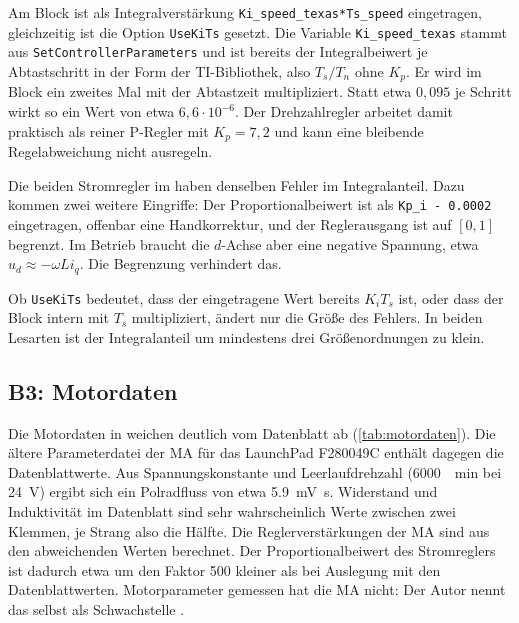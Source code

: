 Am Block  ist als Integralverstärkung
\texttt{Ki\_speed\_texas*Ts\_speed} eingetragen, gleichzeitig ist die Option
\texttt{UseKiTs} gesetzt. Die Variable \texttt{Ki\_speed\_texas} stammt aus
\texttt{SetControllerParameters} und ist bereits der Integralbeiwert je Abtastschritt in der
Form der TI-Bibliothek, also $T_s/T_n$ ohne $K_p$. Er wird im Block ein zweites Mal mit der
Abtastzeit multipliziert. Statt etwa $0{,}095$ je Schritt wirkt so ein Wert von etwa
$6{,}6 \cdot 10^{-6}$. Der Drehzahlregler arbeitet damit praktisch als reiner P-Regler mit
$K_p = 7{,}2$ und kann eine bleibende Regelabweichung nicht ausregeln.

Die beiden Stromregler im  haben denselben Fehler im
Integralanteil. Dazu kommen zwei weitere Eingriffe: Der Proportionalbeiwert ist als
\texttt{Kp\_i - 0.0002} eingetragen, offenbar eine Handkorrektur, und der Reglerausgang ist
auf $[0, 1]$ begrenzt. Im Betrieb braucht die $d$-Achse aber eine negative Spannung, etwa
$u_d \approx -\omega L i_q$. Die Begrenzung verhindert das.

Ob \texttt{UseKiTs} bedeutet, dass der eingetragene Wert bereits $K_i T_s$ ist, oder dass der
Block intern mit $T_s$ multipliziert, ändert nur die Größe des Fehlers. In beiden Lesarten
ist der Integralanteil um mindestens drei Größenordnungen zu klein.

\subsection*{B3: Motordaten}

Die Motordaten in  weichen deutlich vom Datenblatt ab
(\cref{tab:motordaten}). Die ältere Parameterdatei der \ac{MA} für das LaunchPad F280049C
enthält dagegen die Datenblattwerte. Aus Spannungskonstante und Leerlaufdrehzahl
(\SI{6000}{\per\minute} bei \SI{24}{\volt}) ergibt sich ein Polradfluss von etwa
\SI{5,9}{\milli\volt\second}. Widerstand und Induktivität im Datenblatt sind sehr
wahrscheinlich Werte zwischen zwei Klemmen, je Strang also die Hälfte. Die
Reglerverstärkungen der \ac{MA} sind aus den abweichenden Werten berechnet. Der
Proportionalbeiwert des Stromreglers ist dadurch etwa um den Faktor 500 kleiner als bei
Auslegung mit den Datenblattwerten. Motorparameter gemessen hat die \ac{MA} nicht: Der Autor
nennt das selbst als Schwachstelle \cite{akguel2023}.


